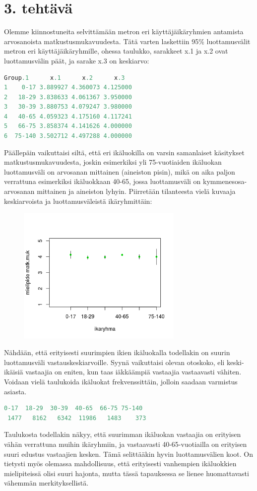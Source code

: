 \documentclass[a4paper]{article}
\begin{document}
\section*{3. tehtävä}
Olemme kiinnostuneita selvittämään metron eri käyttäjäikäryhmien antamista arvosanoista matkustusmukavuudesta. Tätä varten laskettiin 95\% luottamusvälit metron eri käyttäjäikäryhmille, ohessa taulukko, sarakkeet x.1 ja x.2 ovat luottamusvälin päät, ja sarake x.3 on keskiarvo: \\
\begin{lstlisting}[language=R]
  Group.1      x.1      x.2      x.3
1    0-17 3.889927 4.360073 4.125000
2   18-29 3.838633 4.061367 3.950000
3   30-39 3.880753 4.079247 3.980000
4   40-65 4.059323 4.175160 4.117241
5   66-75 3.858374 4.141626 4.000000
6  75-140 3.502712 4.497288 4.000000
\end{lstlisting}
Päällepäin vaikuttaisi siltä, että eri ikäluokilla on varsin samanlaiset käsitykset matkustusmukavuudesta, joskin esimerkiksi yli 75-vuotiaiden ikäluokan luottamusväli on arvosanan mittainen (aineiston pisin), mikä on aika paljon verrattuna esimerkiksi ikäluokkaan 40-65, jossa luottamusväli on kymmenesosa-arvosanan mittainen ja aineiston lyhyin. Piirretään tilanteesta vielä kuvaaja keskiarvoista ja luottamusväleistä ikäryhmittäin:
\begin{figure}[H]
\includegraphics[width=8cm]{2305_3d.png}
\end{figure}
Nähdään, että erityisesti suurimpien ikien ikäluokalla todellakin on suurin luottamusväli vastauskeskiarvoille. Syynä vaikuttaisi olevan otoskoko, eli keski-ikäisiä vastaajia on eniten, kun taas iäkkäämpiä vastaajia vastaavasti vähiten. Voidaan vielä taulukoida ikäluokat frekvenssittäin, jolloin saadaan varmistus asiasta.
\begin{lstlisting}[language=R]
 0-17  18-29  30-39  40-65  66-75 75-140 
 1477   8162   6342  11986   1483    373 
\end{lstlisting}
Taulukosta todellakin näkyy, että suurimman ikäluokan vastaajia on erityisen vähän verrattuna muihin ikäryhmiin, ja vastaavasti 40-65-vuotiailla on erityisen suuri edustus vastaajien kesken. Tämä selittääkin hyvin luottamusvälien koot. On tietysti myös olemassa mahdollisuus, että erityisesti vanhempien ikäluokkien mielipiteissä olisi suuri hajonta, mutta tässä tapauksessa se lienee huomattavasti vähemmän merkityksellistä.
\end{document}
